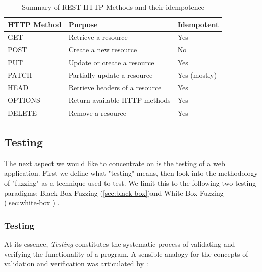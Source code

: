 \begin{table}[htb]
    \centering
    \begin{tabular}{@{}lll@{}}
        \toprule
        \textbf{HTTP Method} & \textbf{Purpose}                         & \textbf{Idempotent} \\ \midrule
        GET                   & Retrieve a resource                     & Yes                 \\
        POST                  & Create a new resource                   & No                  \\
        PUT                   & Update or create a resource             & Yes                 \\
        PATCH                 & Partially update a resource             & Yes (mostly)        \\
        HEAD                  & Retrieve headers of a resource         & Yes                 \\
        OPTIONS               & Return available HTTP methods           & Yes                 \\
        DELETE                & Remove a resource                       & Yes                 \\ \bottomrule
    \end{tabular}
    \caption{Summary of REST HTTP Methods and their idempotence \cite[chapter 9]{fielding_http_2022}}
    \label{tab:rest_http_methods}
\end{table}
\FloatBarrier
\subsection{Testing}
\label{sec:testing}

The next aspect we would like to concentrate on is the testing of a web application. First we define what "testing" means, then look into the methodology of "fuzzing" as a technique used to test. We limit this to the following two testing paradigms:
Black Box Fuzzing (\autoref{sec:black-box})and White Box Fuzzing (\autoref{sec:white-box}) .

\subsubsection{Testing}
At its essence, \textit{Testing} constitutes the systematic process of validating and verifying the functionality of a program. A sensible analogy for the concepts of validation and verification was articulated by \citet{b_w_boehm_verifying_1984}:

